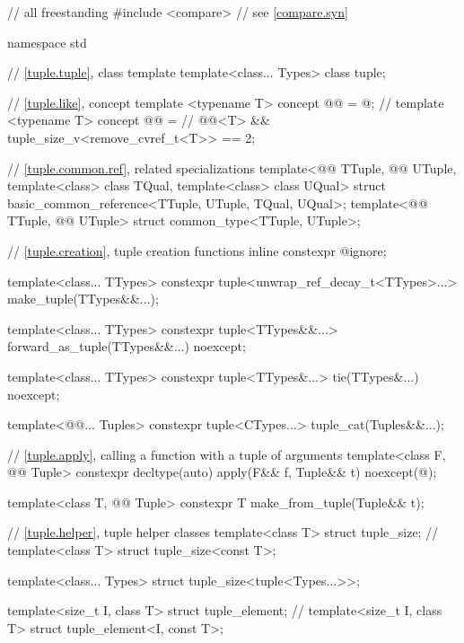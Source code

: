 %
\begin{codeblock}
// all freestanding
#include <compare>              // see \ref{compare.syn}

namespace std {
  // \ref{tuple.tuple}, class template 
  template<class... Types>
    class tuple;

  // \ref{tuple.like}, concept 
  template <typename T>
    concept @@ = @\seebelownc@;         // \expos
  template <typename T>
    concept @@ =                     // \expos
      @@<T> && tuple_size_v<remove_cvref_t<T>> == 2;

  // \ref{tuple.common.ref},  related specializations
  template<@@ TTuple, @@ UTuple,
           template<class> class TQual, template<class> class UQual>
    struct basic_common_reference<TTuple, UTuple, TQual, UQual>;
  template<@@ TTuple, @@ UTuple>
    struct common_type<TTuple, UTuple>;

  // \ref{tuple.creation}, tuple creation functions
  inline constexpr @\unspec@ ignore;

  template<class... TTypes>
    constexpr tuple<unwrap_ref_decay_t<TTypes>...> make_tuple(TTypes&&...);

  template<class... TTypes>
    constexpr tuple<TTypes&&...> forward_as_tuple(TTypes&&...) noexcept;

  template<class... TTypes>
    constexpr tuple<TTypes&...> tie(TTypes&...) noexcept;

  template<@@... Tuples>
    constexpr tuple<CTypes...> tuple_cat(Tuples&&...);

  // \ref{tuple.apply}, calling a function with a tuple of arguments
  template<class F, @@ Tuple>
    constexpr decltype(auto) apply(F&& f, Tuple&& t) noexcept(@\seebelow@);

  template<class T, @@ Tuple>
    constexpr T make_from_tuple(Tuple&& t);

  // \ref{tuple.helper}, tuple helper classes
  template<class T> struct tuple_size;                  // \notdef
  template<class T> struct tuple_size<const T>;

  template<class... Types> struct tuple_size<tuple<Types...>>;

  template<size_t I, class T> struct tuple_element;     // \notdef
  template<size_t I, class T> struct tuple_element<I, const T>;

}
\end{codeblock}

